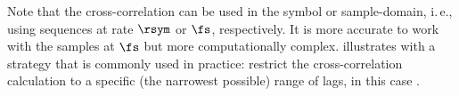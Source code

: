 Note that the cross-correlation can be used in the symbol or sample-domain, i.\,e., using sequences at rate $\rsym$ or $\fs$, respectively. It is more accurate to work with the samples at $\fs$ but more computationally complex.  illustrates with  a strategy that is commonly used in practice: restrict the cross-correlation calculation to a specific (the narrowest possible) range of lags, in this case .
\eApplication



